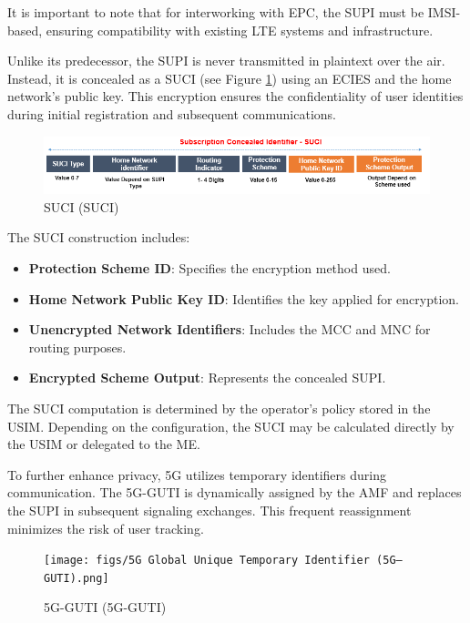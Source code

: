 It is important to note that for interworking with \ac{EPC}, the \ac{SUPI} must be \ac{IMSI}-based, ensuring compatibility with existing \ac{LTE} systems and infrastructure.

Unlike its predecessor, the \ac{SUPI} is never transmitted in plaintext over the air. Instead, it is concealed as a \ac{SUCI} (see Figure \ref{fig:Subscription Concealed Identifier (SUCI)}) using an \ac{ECIES} and the home network’s public key. This encryption ensures the confidentiality of user identities during initial registration and subsequent communications.

\begin{figure}
    \centering
    \includegraphics[width=0.75\linewidth]{figs/Subscription Concealed Identifier (SUCI).png}
    \caption{\acl{SUCI} (\ac{SUCI})}
    \label{fig:Subscription Concealed Identifier (SUCI)}
\end{figure}

The \ac{SUCI} construction includes:
\begin{itemize}
    \item{
        \textbf{Protection Scheme ID}: Specifies the encryption method used.
    }
    \item{
        \textbf{Home Network Public Key ID}: Identifies the key applied for encryption.
    }
    \item{
        \textbf{Unencrypted Network Identifiers}: Includes the \ac{MCC} and \ac{MNC} for routing purposes.
    }
    \item{
        \textbf{Encrypted Scheme Output}: Represents the concealed \ac{SUPI}.
    }
\end{itemize}

The \ac{SUCI} computation is determined by the operator's policy stored in the \ac{USIM}. Depending on the configuration, the \ac{SUCI} may be calculated directly by the \ac{USIM} or delegated to the \ac{ME}.

To further enhance privacy, \ac{5G} utilizes temporary identifiers during communication. The \acl{5G-GUTI} is dynamically assigned by the \ac{AMF} and replaces the \ac{SUPI} in subsequent signaling exchanges. This frequent reassignment minimizes the risk of user tracking.

\begin{figure}
    \centering
    \texttt{[image: figs/5G Global Unique Temporary Identifier (5G–GUTI).png]}
    \caption{\acl{5G-GUTI} (\ac{5G-GUTI})}
    \label{fig:5G Global Unique Temporary Identifier (5G–GUTI)}
\end{figure}

